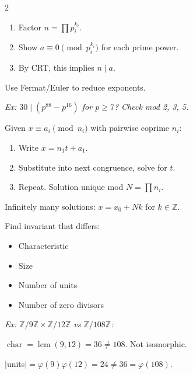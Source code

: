 \documentclass[8pt,a4paper]{extarticle}
\newcommand{\Z}{\mathbb{Z}}
\newcommand{\lcm}{\operatorname{lcm}}
\newcommand{\chr}{\operatorname{char}}
\begin{document}
\begin{multicols}{2}
\begin{enumerate}[leftmargin=*, itemsep=1pt, topsep=2pt]
\item Factor $n = \prod p_i^{k_i}$.
\item Show $a \equiv 0 \pmod{p_i^{k_i}}$ for each prime power.
\item By CRT, this implies $n \mid a$.
\end{enumerate}

Use Fermat/Euler to reduce exponents.

\textit{Ex: $30 \mid (p^{88} - p^{16})$ for $p \ge 7$? Check mod 2, 3, 5.}

\vspace{6pt}
\vspace{3pt}

Given $x \equiv a_i \pmod{n_i}$ with pairwise coprime $n_i$:

\begin{enumerate}[leftmargin=*, itemsep=1pt, topsep=2pt]
\item Write $x = n_1 t + a_1$.
\item Substitute into next congruence, solve for $t$.
\item Repeat. Solution unique mod $N = \prod n_i$.
\end{enumerate}

Infinitely many solutions: $x = x_0 + Nk$ for $k \in \Z$.

\vspace{6pt}
\vspace{3pt}

Find invariant that differs:
\begin{itemize}[leftmargin=*, itemsep=1pt, topsep=2pt]
\item Characteristic
\item Size
\item Number of units
\item Number of zero divisors
\end{itemize}

\textit{Ex: $\Z/9\Z \times \Z/12\Z$ vs $\Z/108\Z$:}

$\chr = \lcm(9,12) = 36 \neq 108$. Not isomorphic.

$|$units$| = \varphi(9)\varphi(12) = 24 \neq 36 = \varphi(108)$.

\vspace{6pt}
\vspace{3pt}


\end{multicols}
\end{document}

